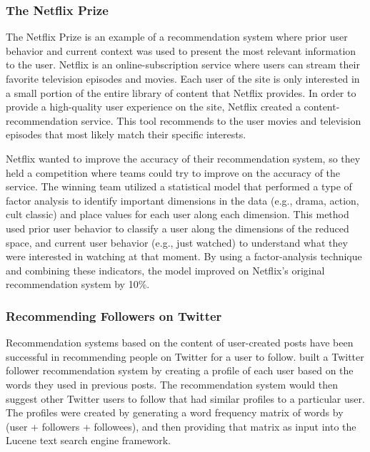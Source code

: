 \documentclass[man,floatsintext,donotrepeattitle]{apa6}
\begin{document}
\subsubsection{The Netflix Prize}

The Netflix Prize \parencite{Bennett2007} is an example of a recommendation system where prior user behavior and current context was used to present the most relevant information to the user.
Netflix is an online-subscription service where users can stream their favorite television episodes and movies.
Each user of the site is only interested in a small portion of the entire library of content that Netflix provides.
In order to provide a high-quality user experience on the site, Netflix created a content-recommendation service.
This tool recommends to the user movies and television episodes that most likely match their specific interests.

Netflix wanted to improve the accuracy of their recommendation system, so they held a competition where teams could try to improve on the accuracy of the service.
The winning team utilized a statistical model that performed a type of factor analysis to identify important dimensions in the data (e.g., drama, action, cult classic) and place values for each user along each dimension. 
This method used prior user behavior to classify a user along the dimensions of the reduced space, and current user behavior (e.g., just watched) to understand what they were interested in watching at that moment.
By using a factor-analysis technique and combining these indicators, the model improved on Netflix's original recommendation system by 10\%.

\subsubsection{Recommending Followers on Twitter}

Recommendation systems based on the content of user-created posts have been successful in recommending people on Twitter for a user to follow.
\textcite{Hannon2010} built a Twitter follower recommendation system by creating a profile of each user based on the words they used in previous posts.
The recommendation system would then suggest other Twitter users to follow that had similar profiles to a particular user.
The profiles were created by generating a word frequency matrix of words by (user + followers + followees), and then providing that matrix as input into the Lucene text search engine framework.
\end{document}
